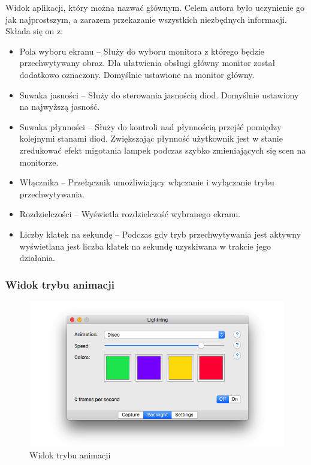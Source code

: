 \documentclass[12pt]{report}
\begin{document}
Widok aplikacji, który można nazwać głównym. Celem autora było uczynienie go jak najprostszym, a zarazem przekazanie wszystkich niezbędnych informacji. Składa się on z:

\begin{itemize}
	\item Pola wyboru ekranu -- Służy do wyboru monitora z którego będzie przechwytywany obraz. Dla ułatwienia obsługi główny monitor został dodatkowo oznaczony. Domyślnie ustawione na monitor główny.
	\item Suwaka jasności -- Służy do sterowania jasnością diod. Domyślnie ustawiony na najwyższą jasność.
	\item Suwaka płynności -- Służy do kontroli nad płynnością przejść pomiędzy kolejnymi stanami diod. Zwiększając płynność użytkownik jest w stanie zredukować efekt migotania lampek podczas szybko zmieniających się scen na monitorze.
	\item Włącznika -- Przełącznik umożliwiający włączanie i wyłączanie trybu przechwytywania.
	\item Rozdzielczości -- Wyświetla rozdzielczość wybranego ekranu.
	\item Liczby klatek na sekundę -- Podczas gdy tryb przechwytywania jest aktywny wyświetlana jest liczba klatek na sekundę uzyskiwana w trakcie jego działania.
\end{itemize}

\subsubsection{Widok trybu animacji}

\begin{figure}[h!]
\centering
\includegraphics[width=\textwidth]{../resources/backlight.png}
\caption{Widok trybu animacji}
\end{figure}
\end{document}
